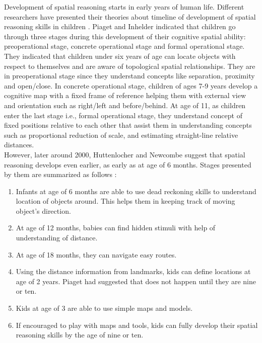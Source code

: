 Development of spatial reasoning starts in early years of human life. Different researchers have presented their theories about timeline of development of spatial reasoning skills in children \parencite{yilmaz2017development}. Piaget and Inhelder \parencite{piaget1956child} indicated that children go through three stages during this development of their cognitive spatial ability: preoperational stage, concrete operational stage and formal operational stage. They indicated that children under six years of age can locate objects with respect to themselves and are aware of topological spatial relationships. They are in preoperational stage since they understand concepts like separation, proximity and open/close. In concrete operational stage, children of ages 7-9 years develop a cognitive map with a fixed frame of reference helping them with external view and orientation such as right/left and before/behind. At age of 11, as children enter the last stage i.e., formal operational stage, they understand concept of fixed positions relative to each other that assist them in understanding concepts such as proportional reduction of scale, and estimating straight-line relative distances. \\
However, later around 2000, Huttenlocher and Newcombe \parencite{huttenlocher1999spatial} suggest that spatial reasoning develops even earlier, as early as at age of 6 months. Stages presented by them are summarized as follows \parencite{yilmaz2017development}: 
\begin{enumerate}
    \item Infants at age of 6 months are able to use dead reckoning skills to understand location of objects around. This helps them in keeping track of moving object's direction.
    \item At age of 12 months, babies can find hidden stimuli with help of understanding of distance.
    \item At age of 18 months, they can navigate easy routes.
    \item Using the distance information from landmarks, kids can define locations at age of 2 years. Piaget had suggested that does not happen until they are nine or ten. 
    \item Kids at age of 3 are able to use simple maps and models.
    \item If encouraged to play with maps and tools, kids can fully develop their spatial reasoning skills by the age of nine or ten. 
\end{enumerate}
